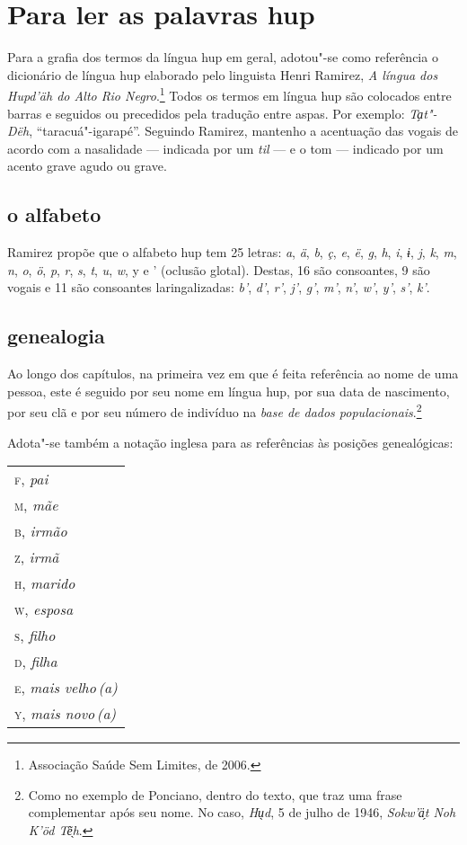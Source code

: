 \chapter{Para ler as palavras hup}

Para a grafia dos termos da língua hup em geral, adotou"-se como
referência o dicionário de língua hup elaborado pelo linguista Henri
Ramirez, \textit{A língua dos Hupd'äh do Alto Rio Negro}.\footnote{Associação Saúde
Sem Limites, de 2006.} Todos os termos em língua hup são colocados entre
barras e seguidos ou precedidos pela tradução entre aspas. Por exemplo: 
\textit{Ta̗t"-Dëh}, ``taracuá"-igarapé''. Seguindo Ramirez, mantenho a acentuação
das vogais de acordo com a nasalidade --- indicada por um \textit{til} --- e o tom --- indicado por um acento grave agudo ou grave.

\section{o alfabeto}

Ramirez propõe que o alfabeto hup tem 25 letras: \textit{a}, \textit{ä}, \textit{b}, \textit{ç}, \textit{e}, \textit{ë}, \textit{g},
\textit{h}, \textit{i}, \textit{ɨ}, \textit{j}, \textit{k}, \textit{m}, \textit{n}, \textit{o}, \textit{ö}, \textit{p}, \textit{r}, \textit{s}, \textit{t}, \textit{u}, \textit{w}, y e ' (oclusão
glotal). Destas, 16 são consoantes, 9 são vogais e 11 são consoantes
laringalizadas: \textit{b'}, \textit{d'}, \textit{r'}, \textit{j'}, \textit{g'}, \textit{m'}, \textit{n'}, \textit{w'}, \textit{y'}, \textit{s'}, \textit{k'}.

\section{genealogia}

Ao longo dos capítulos, na primeira vez em que é feita referência ao nome de
uma pessoa, este é seguido por seu nome em língua hup, por sua data de
nascimento, por seu clã e por seu número de indivíduo na \textit{base de dados
populacionais}.\footnote{Como no exemplo de Ponciano, dentro do texto, que traz uma frase complementar após seu nome. No caso, \textit{Hu̖d}, 5 de julho de 1946, \textit{Sokw'ä̗t Noh K'öd Tẽ̖h}.} 

Adota"-se também a notação inglesa para as referências às posições genealógicas:

\begingroup
\begin{tabular}{l}
\textsc{f}, \textit{pai}\\
\textsc{m}, \textit{mãe}\\
\textsc{b}, \textit{irmão}\\
\textsc{z}, \textit{irmã}\\
\textsc{h}, \textit{marido}\\
\textsc{w}, \textit{esposa}\\
\textsc{s}, \textit{filho}\\
\textsc{d}, \textit{filha}\\
\textsc{e}, \textit{mais velho\,(a)}\\
\textsc{y}, \textit{mais novo\,(a)}\\
\end{tabular}

